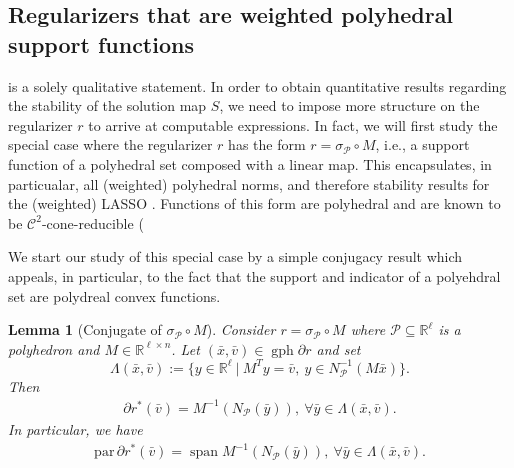 \documentclass[reqno]{amsart}
\newtheorem{lemma}[proposition]{Lemma}
\numberwithin{equation}{section}
\newcommand{\R}{\mathbb{R}}
\newcommand{\pol}{\mathcal{P}}
\newcommand{\x}{\bar{x}}
\newcommand{\st}{\text{ such that }}
\newcommand{\gph}{\operatorname{gph}}
\newcommand{\para}{\mathrm{par}\,}
\newcommand{\rge}{\operatorname{rge}}
\begin{document}
\subsection{Regularizers that are weighted polyhedral support functions}

\noindent
{} is a solely qualitative statement. In order to obtain quantitative results regarding the stability of the solution map $S$, we need to impose more structure on the regularizer $r$ to arrive at computable expressions. In fact, we will first study the special case where the regularizer $r$ has the form  $r=\sigma_\mathcal P\circ M$, i.e., a support function of a polyhedral set composed with a linear map. This encapsulates, in particualar, all (weighted) polyhedral norms,  and therefore  stability results for the (weighted)  LASSO \cite{BBH 22, GKM 18}.  Functions of this form are polyhedral and are known to be $\mathcal{C}^2$-cone-reducible (\cite[Remark 3.6(a)]{CHNS 26}


 We start our study of this special case by a simple conjugacy result which appeals, in particular, to the fact that the support and indicator of a polyehdral set are polydreal convex functions.



\begin{lemma}[Conjugate of $\sigma_\pol\circ M$]\label{lem:rsubdiff}
    Consider  $r = \sigma_{\pol} \circ M$ where $\pol\subseteq \R^{\ell}$ is a polyhedron and $M \in \R^{\ell \times n}$. 
 Let 
$(\x, \bar v) \in \gph \partial r$ and set 
\begin{equation}\label{eq:Lambda}
  \Lambda(\x, \bar v) := \{y\in \R^{\ell} \ | \ M^Ty = \bar v , \ y \in N_{\pol}^{-1}(M\x)\}.  
\end{equation}
Then
\begin{align*}
    \partial r^* (\bar v) = M^{-1} (N_{\pol}(\bar y)), \ \forall \bar y \in \Lambda (\x, \bar v).
\end{align*} 
In particular, we have
\begin{align}\label{eq:rpara}
\para \partial r^*(\bar v) = \operatorname{span} M^{-1}( N_{\pol}(\bar y)) , \ \forall \bar y \in \Lambda(\x, \bar v).
\end{align}
\end{lemma}
\end{document}
